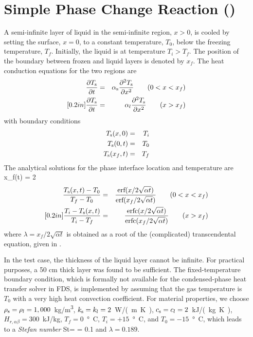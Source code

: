 \documentclass[11pt]{book}
\begin{document}
\section{Simple Phase Change Reaction (\texorpdfstring{}{pcm\_slab})}

A semi-infinite layer of liquid in the semi-infinite region, $x>0$,
is cooled by setting the surface, $x=0$, to a constant temperature, $T_0$,
below the freezing temperature, $T_f$. Initially, the liquid is at temperature $T_i > T_f$. The position of the boundary between frozen and liquid layers
is denoted by $x_f$. The heat conduction equations for the two regions are
\begin{eqnarray}
\frac{\partial T_{\rm s}}{\partial t} & = & \alpha_{\rm s} \frac{\partial^2 T_{\rm s}}{\partial x^2} \quad \quad (0 < x < x_f) \\ [0.2in]
\frac{\partial T_{\rm s}}{\partial t} & = & \alpha_l \frac{\partial^2 T_{\rm s}}{\partial x^2} \quad \quad (x > x_f)
\end{eqnarray}
with boundary conditions
\begin{eqnarray}
T_{\rm s}(x,0)   &= & T_i \nonumber \\
T_{\rm s}(0,t)   &= & T_0 \nonumber \\
T_{\rm s}(x_f,t) &= & T_f \nonumber
\end{eqnarray}
The analytical solutions for the phase interface location and temperature are \cite{Carslaw:1}
\be
x_f(t) = 2 \lambda {}
\ee
\begin{eqnarray}
\frac{T_{\rm s}(x,t)-T_0}{T_f - T_0} &=& \frac{\hbox{erf}(x/2\sqrt{\alpha t})} {\hbox{erf} (x_f/2\sqrt{\alpha t})} \quad \quad (0 < x < x_f) \\ [0.2in]
\frac{T_i-T_{\rm s}(x,t)}{T_i - T_f} &=& \frac{\hbox{erfc}(x/2\sqrt{\alpha t})}{\hbox{erfc}(x_f/2\sqrt{\alpha t})} \quad \quad (x > x_f)
\end{eqnarray}
where $\lambda = x_f /2\sqrt{\alpha t}$ is obtained as a root of the (complicated)
transcendental equation, given in \cite{Carslaw:1}.

In the test case, the thickness of the liquid layer cannot be infinite. For practical purposes, a 50 cm thick layer was found to be sufficient.
The fixed-temperature boundary condition, which is formally not available for the condensed-phase heat transfer solver in FDS,
is implemented by assuming that the gas temperature is $T_0$ with a very high heat convection coefficient.
For material properties, we choose $\rho_{\rm s} = \rho_l =1,000$~\si{kg/m^3},
$k_{\rm s} = k_l = 2$~\si{W/(m.K)}, $c_{\rm s} = c_l = 2$~\si{kJ/(kg.K)}, $H_{r,\alpha\beta}=300$~kJ/kg, $T_f = 0$~\si{\degree C}, $T_i = +15$~\si{\degree C},
and $T_0 = -15$~\si{\degree C}, which leads to a {\em Stefan number}
\be
\hbox{St}= = 0.1
\ee
and $\lambda = 0.189$.
\end{document}
